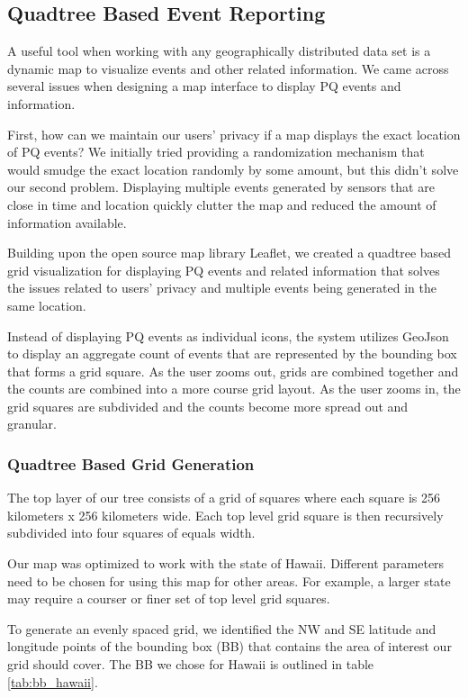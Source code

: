 \subsection{Quadtree Based Event Reporting}
A useful tool when working with any geographically distributed data set is a dynamic map to visualize events and other related information. We came across several issues when designing a map interface to display PQ events and information.

First, how can we maintain our users' privacy if a map displays the exact location of PQ events? We initially tried providing a randomization mechanism that would smudge the exact location randomly by some amount, but this didn't solve our second problem. Displaying multiple events generated by sensors that are close in time and location quickly clutter the map and reduced the amount of information available.

Building upon the open source map library Leaflet, we created a quadtree based grid visualization for displaying PQ events and related information that solves the issues related to users' privacy and multiple events being generated in the same location.

Instead of displaying PQ events as individual icons, the system utilizes GeoJson to display an aggregate count of events that are represented by the bounding box that forms a grid square. As the user zooms out, grids are combined together and the counts are combined into a more course grid layout. As the user zooms in, the grid squares are subdivided and the counts become more spread out and granular.

\subsubsection{Quadtree Based Grid Generation}
The top layer of our tree consists of a grid of squares where each square is 256 kilometers x 256 kilometers wide. Each top level grid square is then recursively subdivided into four squares of equals width. 

Our map was optimized to work with the state of Hawaii. Different parameters need to be chosen for using this map for other areas. For example, a larger state may require a courser or finer set of top level grid squares.

To generate an evenly spaced grid, we identified the NW and SE latitude and longitude points of the bounding box (BB) that contains the area of interest our grid should cover. The BB we chose for Hawaii is outlined in table \ref{tab:bb_hawaii}.

